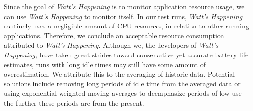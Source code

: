 Since the goal of \emph{Watt's Happening} is to monitor application resource usage, we can use  \emph{Watt's Happening} to monitor itself.
In our test runs, \emph{Watt's Happening} routinely uses a negligible amount of CPU resources, in relation to other running applications.
Therefore, we conclude an acceptable resource consumption attributed to \emph{Watt's Happening}.
Although we, the developers of \emph{Watt's Happening}, have taken great strides toward conservative yet accurate battery life estimates, runs with long idle times may still have some amount of overestimation.
%
%
We attribute this to the averaging of historic data.  
Potential solutions include removing long periods of idle time from the averaged data or using exponential weighted moving averages to deemphasize periods of low use the further these periods are from the present.

